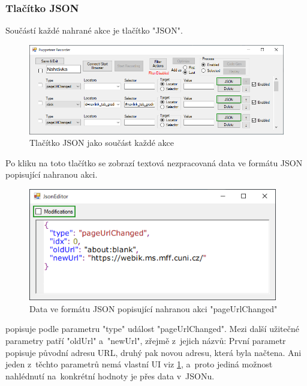 \documentclass[12pt, a4paper, twoside]{article}
\begin{document}
	\subsubsection{Tlačítko JSON}
	\label{subsub_sec:jsonTutorial}
	Součástí každé nahrané akce je tlačítko "JSON". 
	\nopagebreak
	\begin{figure}[H]
		\centering
		\includegraphics[width=1.0\textwidth]{jsonButton.png}
		\caption{Tlačítko JSON jako součást každé akce}
		\label{fig:jsonButtonHighlight}
	\end{figure}
	Po kliku na toto tlačítko se zobrazí textová nezpracovaná data ve formátu JSON popisující nahranou akci.
	\begin{figure}[H]
		\centering
		\includegraphics[width=0.97\textwidth]{jsonEditor.png}
		\caption{Data ve formátu JSON popisující nahranou akci "pageUrlChanged"}
		\label{fig:jsonEditor}
	\end{figure}
	 popisuje podle parametru "type" událost "pageUrlChanged". Mezi další užitečné parametry patří "oldUrl" a~"newUrl", zřejmě z~jejich názvů: První parametr popisuje původní adresu URL, druhý pak novou adresu, která byla načtena. Ani jeden z~těchto parametrů nemá vlastní UI viz \cref{fig:jsonButtonHighlight}, a~proto jediná možnost nahlédnutí na~konkrétní hodnoty je přes data v~JSONu.
	
\end{document}
